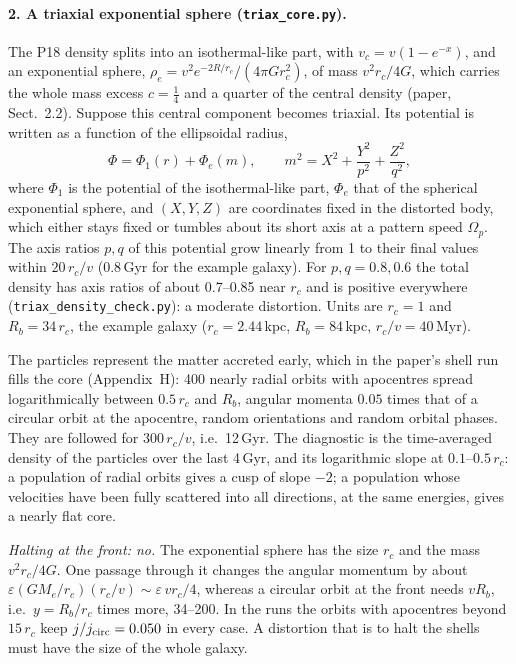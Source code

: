 \documentclass[11pt,a4paper]{article}
\begin{document}
\paragraph{2. A triaxial exponential sphere (\texttt{triax\_core.py}).} The P18
density splits into an isothermal-like part, with $v_c=v(1-e^{-x})$, and an
exponential sphere, $\rho_e=v^2e^{-2R/r_c}/(4\pi Gr_c^2)$, of mass $v^2r_c/4G$, which
carries the whole mass excess $c=\tfrac14$ and a quarter of the central density
(paper, Sect.~2.2). Suppose this central component becomes triaxial. Its potential
is written as a function of the ellipsoidal radius,
\begin{equation}
  \Phi=\Phi_1(r)+\Phi_e(m),\qquad
  m^2=X^2+\frac{Y^2}{p^2}+\frac{Z^2}{q^2},
\end{equation}
where $\Phi_1$ is the potential of the isothermal-like part, $\Phi_e$ that of the
spherical exponential sphere, and $(X,Y,Z)$ are coordinates fixed in the distorted
body, which either stays fixed or tumbles about its short axis at a pattern speed
$\Omega_p$. The axis ratios $p,q$ of this potential grow linearly from 1 to their
final values within $20\,r_c/v$ (0.8\,Gyr for the example galaxy). For $p,q=0.8,0.6$
the total density has axis ratios of about 0.7--0.85 near $r_c$ and is positive
everywhere (\texttt{triax\_density\_check.py}): a moderate distortion. Units are
$r_c=1$ and $R_b=34\,r_c$, the example galaxy ($r_c=2.44$\,kpc, $R_b=84$\,kpc,
$r_c/v=40$\,Myr).

The particles represent the matter accreted early, which in the paper's shell run
fills the core (Appendix~H): 400 nearly radial orbits with apocentres spread
logarithmically between $0.5\,r_c$ and $R_b$, angular momenta $0.05$ times that of a
circular orbit at the apocentre, random orientations and random orbital phases. They
are followed for $300\,r_c/v$, i.e.\ 12\,Gyr. The diagnostic is the time-averaged
density of the particles over the last 4\,Gyr, and its logarithmic slope at
$0.1$--$0.5\,r_c$: a population of radial orbits gives a cusp of slope $-2$; a
population whose velocities have been fully scattered into all directions, at the
same energies, gives a nearly flat core.

\emph{Halting at the front: no.} The exponential sphere has the size $r_c$ and the
mass $v^2r_c/4G$. One passage through it changes the angular momentum by about
$\varepsilon(GM_e/r_c)(r_c/v)\sim\varepsilon\,vr_c/4$, whereas a circular orbit at the
front needs $vR_b$, i.e.\ $y=R_b/r_c$ times more, 34--200. In the runs the orbits
with apocentres beyond $15\,r_c$ keep $j/j_{\rm circ}=0.050$ in every case. A
distortion that is to halt the shells must have the size of the whole galaxy.
\end{document}
